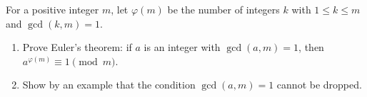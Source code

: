 For a positive integer $m$, let $\varphi(m)$ be the number of integers $k$ with $1\le k\le m$ and $\gcd(k,m)=1$.
\begin{enumerate}
\item[(a)] Prove Euler's theorem: if $a$ is an integer with $\gcd(a,m)=1$, then $a^{\varphi(m)}\equiv1\pmod m$.
\item[(b)] Show by an example that the condition $\gcd(a,m)=1$ cannot be dropped.
\end{enumerate}
